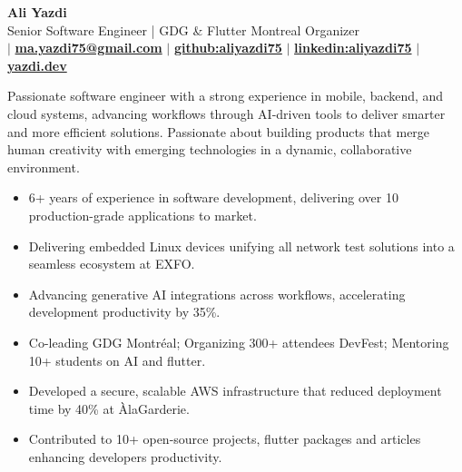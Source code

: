 \documentclass[letterpaper,11pt]{article}
\makeatletter
\newcommand{\CVAuthor}{Ali Yazdi}
\newcommand{\TitleDesciption}{Senior Software Engineer | GDG \& Flutter Montreal Organizer}
\newcommand{\CVWebpageName}{yazdi.dev}
\newcommand{\CVWebpage}{https://yazdi.dev}
\newcommand{\MainEmailName}{ma.yazdi75@gmail.com}
\newcommand{\MainEmail}{mailto:ma.yazdi75@gmail.com}
\newcommand{\LinkedinName}{linkedin:aliyazdi75}
\newcommand{\Linkedin}{https://linkedin.com/in/aliyazdi75}
\newcommand{\GithubName}{github:aliyazdi75}
\newcommand{\Github}{https://github.com/aliyazdi75}
\newcommand{\PhoneName}{}
\newcommand{\Phone}{}
\makeatother
\begin{document}

\begin{center}
      \textbf{\Huge \CVAuthor} \\
      \vspace{1mm}
      \TitleDesciption \\
      \small {\txtcolor\href{\Phone}{\textbf{\PhoneName}}}
      $\vert$
      {\txtcolor\href{\MainEmail}{\textbf{\MainEmailName}}}
      $\vert$
      {\txtcolor\href{\Github}{\textbf{\GithubName}}}
      $\vert$
      {\txtcolor\href{\Linkedin}{\textbf{\LinkedinName}}}
      $\vert$
      {\txtcolor\href{\CVWebpage}{\textbf{\CVWebpageName}}}
\end{center}



Passionate software engineer with a strong experience in mobile, backend, and cloud systems, advancing workflows through AI-driven tools to deliver smarter and more efficient solutions.
Passionate about building products that merge human creativity with emerging technologies in a dynamic, collaborative environment.




\begin{itemize}[leftmargin=*, noitemsep, topsep=0pt, partopsep=0pt]
      \item 6+ years of experience in software development, delivering over 10 production-grade applications to market.
      \item \BigGap Delivering embedded Linux devices unifying all network test solutions into a seamless ecosystem at EXFO.
      \item \BigGap Advancing generative AI integrations across workflows, accelerating development productivity by 35\%.
      \item \BigGap Co-leading GDG Montréal; Organizing 300+ attendees DevFest; Mentoring 10+ students on AI and flutter.
      \item \BigGap Developed a secure, scalable AWS infrastructure that reduced deployment time by 40\% at ÀlaGarderie.
      \item \BigGap Contributed to 10+ open-source projects, flutter packages and articles enhancing developers productivity.
\end{itemize}
\end{document}

